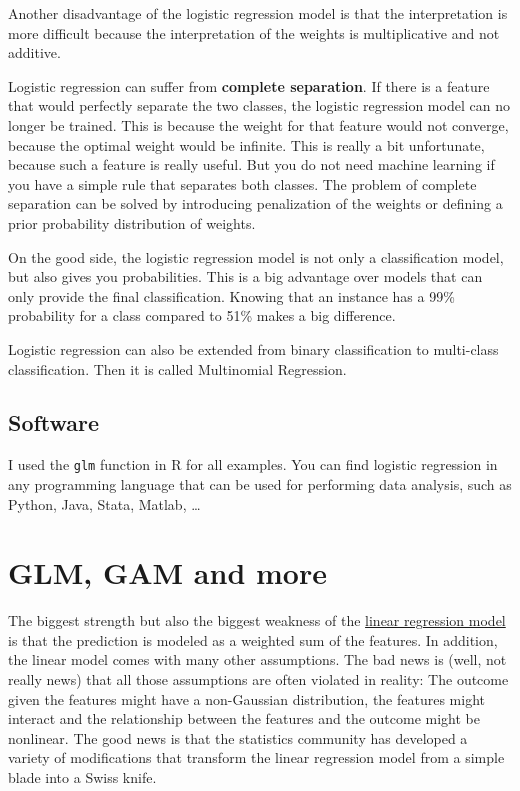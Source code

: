 \documentclass[12pt,]{krantz}
\begin{document}
Another disadvantage of the logistic regression model is that the
interpretation is more difficult because the interpretation of the
weights is multiplicative and not additive.

Logistic regression can suffer from \textbf{complete separation}. If
there is a feature that would perfectly separate the two classes, the
logistic regression model can no longer be trained. This is because the
weight for that feature would not converge, because the optimal weight
would be infinite. This is really a bit unfortunate, because such a
feature is really useful. But you do not need machine learning if you
have a simple rule that separates both classes. The problem of complete
separation can be solved by introducing penalization of the weights or
defining a prior probability distribution of weights.

On the good side, the logistic regression model is not only a
classification model, but also gives you probabilities. This is a big
advantage over models that can only provide the final classification.
Knowing that an instance has a 99\% probability for a class compared to
51\% makes a big difference.

Logistic regression can also be extended from binary classification to
multi-class classification. Then it is called Multinomial Regression.

\subsection{Software}\label{software}

I used the \texttt{glm} function in R for all examples. You can find
logistic regression in any programming language that can be used for
performing data analysis, such as Python, Java, Stata, Matlab, \ldots{}

\newpage

\hypertarget{extend-lm}{\section{GLM, GAM and more}\label{extend-lm}}

The biggest strength but also the biggest weakness of the
\protect\hyperlink{limo}{linear regression model} is that the prediction
is modeled as a weighted sum of the features. In addition, the linear
model comes with many other assumptions. The bad news is (well, not
really news) that all those assumptions are often violated in reality:
The outcome given the features might have a non-Gaussian distribution,
the features might interact and the relationship between the features
and the outcome might be nonlinear. The good news is that the statistics
community has developed a variety of modifications that transform the
linear regression model from a simple blade into a Swiss knife.
\end{document}
